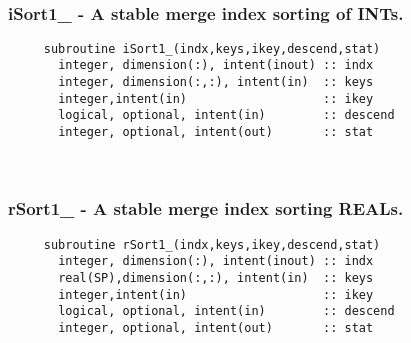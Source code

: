  
\mbox{}\hrulefill\ 
 
  \subsubsection{iSort1\_ - A stable merge index sorting of INTs.}

\begin{verbatim} 
     subroutine iSort1_(indx,keys,ikey,descend,stat)
       integer, dimension(:), intent(inout) :: indx
       integer, dimension(:,:), intent(in)  :: keys
       integer,intent(in)                   :: ikey
       logical, optional, intent(in)        :: descend
       integer, optional, intent(out)       :: stat
 \end{verbatim}%
% 
 
\mbox{}\hrulefill\ 
 
  \subsubsection{rSort1\_ - A stable merge index sorting REALs.}

\begin{verbatim} 
     subroutine rSort1_(indx,keys,ikey,descend,stat)
       integer, dimension(:), intent(inout) :: indx
       real(SP),dimension(:,:), intent(in)  :: keys
       integer,intent(in)                   :: ikey
       logical, optional, intent(in)        :: descend
       integer, optional, intent(out)       :: stat
 \end{verbatim}%
 
 
\mbox{}\hrulefill\ 
 

